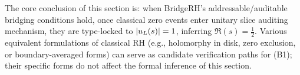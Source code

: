 \begin{remark}
The core conclusion of this section is: when BridgeRH's addressable/auditable bridging conditions hold, once classical zero events enter unitary slice auditing mechanism, they are type-locked to $\left\lvert u_L(s)\right\rvert=1$, inferring $\Re(s)=\tfrac12$. Various equivalent formulations of classical RH (e.g., holomorphy in disk, zero exclusion, or boundary-averaged forms) can serve as candidate verification paths for (B1); their specific forms do not affect the formal inference of this section.\par
\end{remark}
